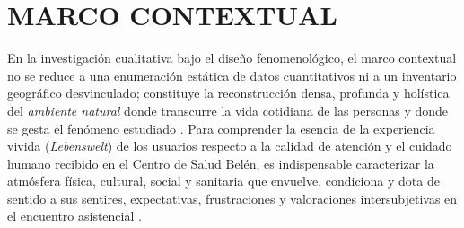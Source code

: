 \section{MARCO CONTEXTUAL}
\label{sec:cap2_contexto}

En la investigación cualitativa bajo el diseño fenomenológico, el marco contextual no se reduce a una enumeración estática de datos cuantitativos ni a un inventario geográfico desvinculado; constituye la reconstrucción densa, profunda y holística del \textit{ambiente natural} donde transcurre la vida cotidiana de las personas y donde se gesta el fenómeno estudiado \cite{sampieri2018, creswell2013}. Para comprender la esencia de la experiencia vivida (\textit{Lebenswelt}) de los usuarios respecto a la calidad de atención y el cuidado humano recibido en el Centro de Salud Belén, es indispensable caracterizar la atmósfera física, cultural, social y sanitaria que envuelve, condiciona y dota de sentido a sus sentires, expectativas, frustraciones y valoraciones intersubjetivas en el encuentro asistencial \cite{vanmanen1990, diresa2025, donabedian2005, watson2008}.

